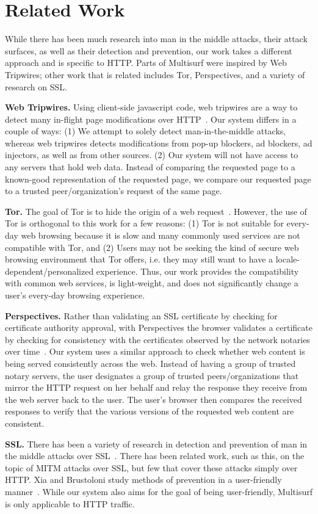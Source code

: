 \section{Related Work}
\label{sec:related}

While there has been much research into man in the middle attacks, their attack surfaces, as well as their detection and prevention, our work takes a different approach and is specific to HTTP.  Parts of Multisurf were inspired by Web Tripwires; other work that is related includes Tor, Perspectives, and a variety of research on SSL.

{\bf Web Tripwires.} Using client-side javascript code, web tripwires are a way to detect many in-flight page modifications over HTTP~\cite{reis2008detecting}.  Our system differs in a couple of ways: (1) We attempt to solely detect man-in-the-middle attacks, whereas web tripwires detects modifications from pop-up blockers, ad blockers, ad injectors, as well as from other sources. (2) Our system will not have access to any servers that hold web data.  Instead of comparing the requested page to a known-good representation of the requested page, we compare our requested page to a trusted peer/organization’s request of the same page. 

{\bf Tor.} The goal of Tor is to hide the origin of a web request~\cite{dingledine2004tor}. However, the use of Tor is orthogonal to this work for a few reasons: (1) Tor is not suitable for every-day web browsing because it is slow and many commonly used services are not compatible with Tor, and (2) Users may not be seeking the kind of secure web browsing environment that Tor offers, i.e. they may still want to have a locale-dependent/personalized experience. Thus, our work provides the compatibility with common web services, is light-weight, and does not significantly change a user’s every-day browsing experience.

{\bf Perspectives.} Rather than validating an SSL certificate by checking for certificate authority approval, with Perspectives the browser validates a certificate by checking for consistency with the certificates observed by the network notaries over time~\cite{wendlandt2008perspectives}. Our system uses a similar approach to check whether web content is being served consistently across the web. Instead of having a group of trusted notary servers, the user designates a group of trusted peers/organizations that mirror the HTTP request on her behalf and relay the response they receive from the web server back to the user. The user’s browser then compares the received responses to verify that the various versions of the requested web content are consistent.             

{\bf SSL.} There has been a variety of research in detection and prevention of man in the middle attacks over SSL~\cite{oppliger2006ssl, callegati2009man, jia2007principle, xia2005hardening, joshi2009mitigating}. There has been related work, such as this, on the topic of MITM attacks over SSL, but few that cover these attacks simply over HTTP.  Xia and Brustoloni study methods of prevention in a user-friendly manner~\cite{xia2005hardening}.  While our system also aims for the goal of being user-friendly, Multisurf is only applicable to HTTP traffic.
